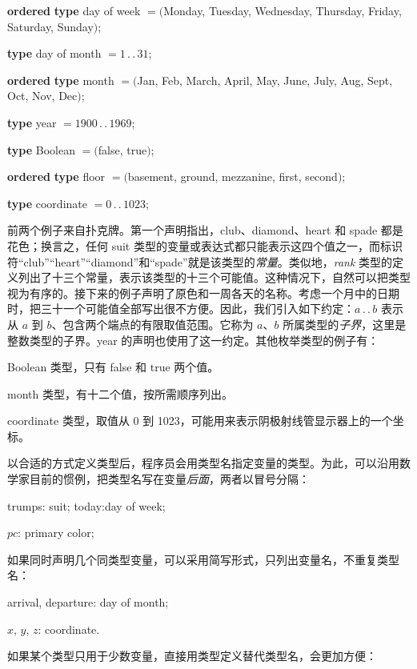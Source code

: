 \noindent
{}\parindent\textbf{ordered} \tabto{3.7em}\textbf{type} day of week $= ($Monday, Tuesday, Wednesday, Thursday, Friday, Saturday, Sunday$)$;
\medskip

\tabto{3.7em}\textbf{type} day of month $= 1\,.\,.\,31$;

\noindent
{}\parindent\textbf{ordered} \tabto{3.7em}\textbf{type} month $= ($Jan, Feb, March, April, May, June, July, Aug, Sept, Oct, Nov, Dec$)$;
\medskip

\tabto{3.7em}\textbf{type} year $= 1900\,.\,.\,1969$;

\tabto{3.7em}\textbf{type} Boolean $= ($false, true$)$;
\medskip

\noindent
{}\parindent\textbf{ordered} \tabto{3.7em}\textbf{type} floor $= ($basement, ground, mezzanine, first, second$)$;

\tabto{3.7em}\textbf{type} coordinate $= 0\,.\,.\,1023$;
\medskip

前两个例子来自扑克牌。第一个声明指出，club、diamond、heart 和 spade 都是花色；换言之，任何 suit 类型的变量或表达式都只能表示这四个值之一，而标识符“club”“heart”“diamond”和“spade”就是该类型的\textit{常量}。类似地，\textit{rank} 类型的定义列出了十三个常量，表示该类型的十三个可能值。这种情况下，自然可以把类型视为有序的。接下来的例子声明了原色和一周各天的名称。考虑一个月中的日期时，把三十一个可能值全部写出很不方便。因此，我们引入如下约定：$a\,.\,.\,b$ 表示从 $a$ 到 $b$、包含两个端点的有限取值范围。它称为 $a$、$b$ 所属类型的\textit{子界}，这里是整数类型的子界。year 的声明也使用了这一约定。其他枚举类型的例子有：

\quad Boolean 类型，只有 false 和 true 两个值。

\quad month 类型，有十二个值，按所需顺序列出。

\parindent\quad coordinate 类型，取值从 0 到 1023，可能用来表示阴极射线管显示器上的一个坐标。

以合适的方式定义类型后，程序员会用类型名指定变量的类型。为此，可以沿用数学家目前的惯例，把类型名写在变量\textit{后面}，两者以冒号分隔：

\quad trumps: suit; today:day of week;

\quad $pc$: primary color;

\noindent
如果同时声明几个同类型变量，可以采用简写形式，只列出变量名，不重复类型名：

\quad arrival, departure: day of month;

\quad $x$, $y$, $z$: coordinate.

\noindent
如果某个类型只用于少数变量，直接用类型定义替代类型名，会更加方便：

